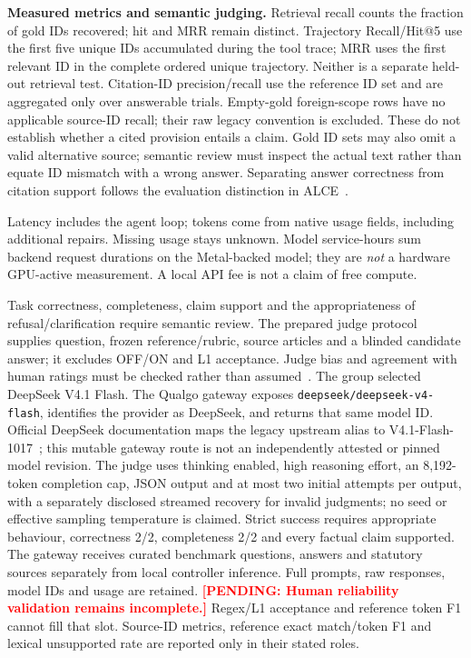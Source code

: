 \documentclass[a4paper,11pt]{article}
\newcommand{\hdr}[1]{\vspace{2pt}\noindent\textbf{#1}}
\newcommand{\pending}[1]{\textcolor{red}{\textbf{[PENDING: #1]}}}
\newcommand{\code}[1]{\nolinkurl{#1}}
\begin{document}
\hdr{Measured metrics and semantic judging.}
Retrieval recall counts the fraction of gold IDs recovered; hit and MRR remain distinct. Trajectory Recall/Hit@5 use the first five unique IDs accumulated during the tool trace; MRR uses the first relevant ID in the complete ordered unique trajectory. Neither is a separate held-out retrieval test. Citation-ID precision/recall use the reference ID set and are aggregated only over answerable trials. Empty-gold foreign-scope rows have no applicable source-ID recall; their raw legacy convention is excluded. These do not establish whether a cited provision entails a claim. Gold ID sets may also omit a valid alternative source; semantic review must inspect the actual text rather than equate ID mismatch with a wrong answer. Separating answer correctness from citation support follows the evaluation distinction in ALCE~\citep{gao2023alce}.

Latency includes the agent loop; tokens come from native usage fields, including additional repairs. Missing usage stays unknown. Model service-hours sum backend request durations on the Metal-backed model; they are \emph{not} a hardware GPU-active measurement. A local API fee is not a claim of free compute.

Task correctness, completeness, claim support and the appropriateness of refusal/clarification require semantic review. The prepared judge protocol supplies question, frozen reference/rubric, source articles and a blinded candidate answer; it excludes OFF/ON and L1 acceptance. Judge bias and agreement with human ratings must be checked rather than assumed~\citep{zheng2023judge}. The group selected DeepSeek V4.1 Flash. The Qualgo gateway exposes \code{deepseek/deepseek-v4-flash}, identifies the provider as DeepSeek, and returns that same model ID. Official DeepSeek documentation maps the legacy upstream alias to V4.1-Flash-1017~\citep{deepseek2026api}; this mutable gateway route is not an independently attested or pinned model revision. The judge uses thinking enabled, high reasoning effort, an 8,192-token completion cap, JSON output and at most two initial attempts per output, with a separately disclosed streamed recovery for invalid judgments; no seed or effective sampling temperature is claimed. Strict success requires appropriate behaviour, correctness 2/2, completeness 2/2 and every factual claim supported. The gateway receives curated benchmark questions, answers and statutory sources separately from local controller inference. Full prompts, raw responses, model IDs and usage are retained. \pending{Human reliability validation remains incomplete.} Regex/L1 acceptance and reference token F1 cannot fill that slot. Source-ID metrics, reference exact match/token F1 and lexical unsupported rate are reported only in their stated roles.
\end{document}
